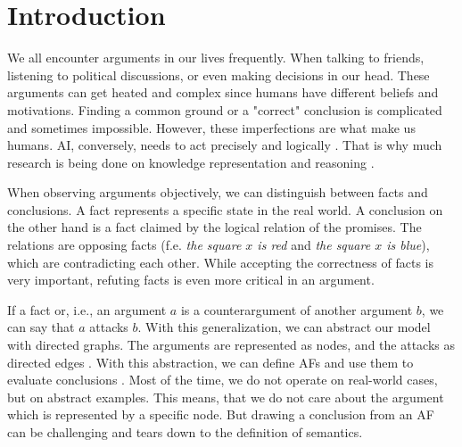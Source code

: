 \chapter{Introduction}
We all encounter arguments in our lives frequently. When talking to friends, listening to political discussions, or even making decisions in our head. These arguments can get heated and complex since humans have different beliefs and motivations. Finding a common ground or a "correct" conclusion is complicated and sometimes impossible. However, these imperfections are what make us humans. \ac{AI}, conversely, needs to act precisely and logically \cite{DBLP:journals/frai/DietzKM24}. That is why much research is being done on knowledge representation and reasoning \cite{DBLP:journals/dagstuhl-manifestos/DelgrandeG0TW24, DBLP:journals/inffus/PopescuD23}.

When observing arguments objectively, we can distinguish between facts and conclusions. A fact represents a specific state in the real world. A conclusion on the other hand is a fact claimed by the logical relation of the promises. The relations are opposing facts (f.e. \emph{the square $x$ is red} and \emph{the square $x$ is blue}), which are contradicting each other. While accepting the correctness of facts is very important, refuting facts is even more critical in an argument.

If a fact or, i.e., an argument $a$ is a counterargument of another argument $b$, we can say that $a$ attacks $b$. With this generalization, we can abstract our model with directed graphs. The arguments are represented as nodes, and the attacks as directed edges \cite{DUNG1995321}. With this abstraction, we can define \acp{AF} and use them to evaluate conclusions \cite{DBLP:conf/fapr/Geffner96}. Most of the time, we do not operate on real-world cases, but on abstract examples. This means, that we do not care about the argument which is represented by a specific node. But drawing a conclusion from an \ac{AF} can be challenging and tears down to the definition of semantics.

